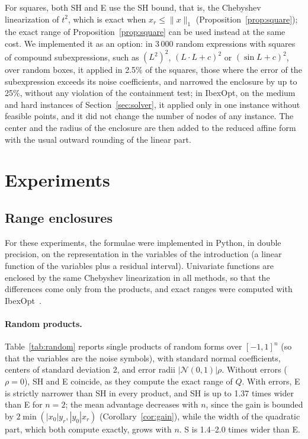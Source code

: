 \documentclass[10pt]{article}
\theoremstyle{definition}
\begin{document}
For squares, both SH and E use the SH bound, that is, the Chebyshev linearization of $t^2$, which is exact when $x_r\le\|x\|_1$ (Proposition~\ref{prop:square}); the exact range of Proposition~\ref{prop:square} can be used instead at the same cost. We implemented it as an option: in 3\,000 random expressions with squares of compound subexpressions, such as $(L^2)^2$, $(L\cdot L+c)^2$ or $(\sin L+c)^2$, over random boxes, it applied in 2.5\% of the squares, those where the error of the subexpression exceeds its noise coefficients, and narrowed the enclosure by up to 25\%, without any violation of the containment test; in IbexOpt, on the medium and hard instances of Section~\ref{sec:solver}, it applied only in one instance without feasible points, and it did not change the number of nodes of any instance. The center and the radius of the enclosure are then added to the reduced affine form with the usual outward rounding of the linear part.

\section{Experiments}
\label{sec:experiments}

\subsection{Range enclosures}

For these experiments, the formulae were implemented in Python, in double precision, on the representation in the variables of the introduction (a linear function of the variables plus a residual interval). Univariate functions are enclosed by the same Chebyshev linearization in all methods, so that the differences come only from the products, and exact ranges were computed with IbexOpt~\cite{chabert2009}.

\paragraph{Random products.} Table~\ref{tab:random} reports single products of random forms over $[-1,1]^n$ (so that the variables are the noise symbols), with standard normal coefficients, centers of standard deviation 2, and error radii $|\mathcal N(0,1)|\rho$. Without errors ($\rho=0$), SH and E coincide, as they compute the exact range of $Q$. With errors, E is strictly narrower than SH in every product, and SH is up to 1.37 times wider than E for $n=2$; the mean advantage decreases with $n$, since the gain is bounded by $2\min(|x_0|y_r,|y_0|x_r)$ (Corollary~\ref{cor:gain}), while the width of the quadratic part, which both compute exactly, grows with $n$. S is 1.4--2.0 times wider than E.
\end{document}
